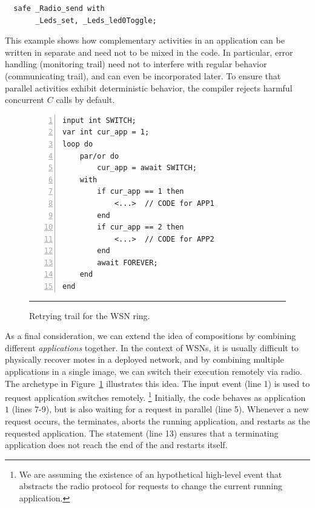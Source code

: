\begin{lstlisting}
  safe _Radio_send with
       _Leds_set, _Leds_led0Toggle;
\end{lstlisting}

This example shows how complementary activities in an application can be 
written in separate and need not to be mixed in the code.
In particular, error handling (monitoring trail) need not to interfere with 
regular behavior (communicating trail), and can even be incorporated later.
To ensure that parallel activities exhibit deterministic behavior, the \CEU 
compiler rejects harmful concurrent $C$ calls by default.

\begin{figure}[ht]
\begin{lstlisting}[numbers=left,xleftmargin=2em]
input int SWITCH;
var int cur_app = 1;
loop do
    par/or do
        cur_app = await SWITCH;
    with
        if cur_app == 1 then
            <...>  // CODE for APP1
        end
        if cur_app == 2 then
            <...>  // CODE for APP2
        end
        await FOREVER;
    end
end
\end{lstlisting}
\rule{14cm}{0.37pt}
\caption{ Retrying trail for the WSN ring.%
{\small %
}%
\label{lst.app}
}
\end{figure}

As a final consideration, we can extend the idea of compositions by combining 
different \emph{applications} together.
In the context of WSNs, it is usually difficult to physically recover motes in 
a deployed network, and by combining multiple applications in a single image, 
we can switch their execution remotely via radio.
%
The archetype in Figure~\ref{lst.app} illustrates this idea.
%
The input event  (line 1) is used to request application switches 
remotely.%
\footnote{ We are assuming the existence of an hypothetical high-level event 
 that abstracts the radio protocol for requests to change the 
current running application. }
Initially, the code behaves as application $1$ (lines 7-9), but is also waiting 
for a  request in parallel (line 5).
Whenever a new request occurs, the  terminates, aborts the running 
application, and restarts as the requested application.
The  statement (line 13) ensures that a terminating 
application does not reach the end of the  and restarts itself.

